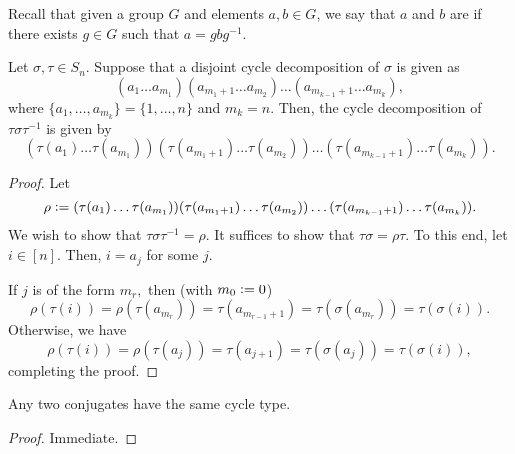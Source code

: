Recall that given a group $G$ and elements $a, b \in G$, we say that $a$ and $b$ are  if there exists $g \in G$ such that $a = gbg^{-1}$.

\begin{prop}
	Let $\sigma, \tau \in S_n.$ Suppose that a disjoint cycle decomposition of $\sigma$ is given as
	\begin{equation*} 
		(a_1 \ldots a_{m_1})(a_{m_1 + 1} \ldots a_{m_2})\ldots(a_{m_{k-1} + 1} \ldots a_{m_k}),
	\end{equation*}
	where $\{a_1, \ldots, a_{m_k}\} = \{1, \ldots, n\}$ and $m_k = n.$ Then, the cycle decomposition of $\tau\sigma\tau^{-1}$ is given by
	\begin{equation*} 
		(\tau(a_1) \ldots \tau(a_{m_1}))(\tau(a_{m_1 + 1}) \ldots \tau(a_{m_2}))\ldots(\tau(a_{m_{k-1} + 1}) \ldots \tau(a_{m_k})).
	\end{equation*}
\end{prop}
\begin{proof} 
	Let 
	\begin{equation*} 
		\rho \vcentcolon= (\tau(a_1) \ldots \tau(a_{m_1}))(\tau(a_{m_1 + 1}) \ldots \tau(a_{m_2}))\ldots(\tau(a_{m_{k-1} + 1}) \ldots \tau(a_{m_k})).
	\end{equation*}
	We wish to show that $\tau\sigma\tau^{-1} = \rho.$ It suffices to show that $\tau\sigma = \rho\tau.$ To this end, let $i \in [n].$ Then, $i = a_{j}$ for some $j.$ 

	If $j$ is of the form $m_r,$ then (with $m_0 \vcentcolon= 0$)
	\begin{equation*} 
		\rho(\tau(i)) = \rho(\tau(a_{m_r})) = \tau(a_{m_{r-1} + 1}) = \tau(\sigma(a_{m_r})) = \tau(\sigma(i)).
	\end{equation*}
	Otherwise, we have
	\begin{equation*} 
		\rho(\tau(i)) = \rho(\tau(a_j)) = \tau(a_{j+1}) = \tau(\sigma(a_j)) = \tau(\sigma(i)),
	\end{equation*}
	completing the proof.
\end{proof}

\begin{cor}
	Any two conjugates have the same cycle type.
\end{cor}
\begin{proof} 
	Immediate.
\end{proof}

